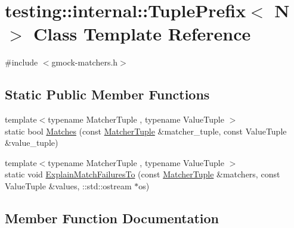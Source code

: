 \hypertarget{classtesting_1_1internal_1_1_tuple_prefix}{}\section{testing\+:\+:internal\+:\+:Tuple\+Prefix$<$ N $>$ Class Template Reference}
\label{classtesting_1_1internal_1_1_tuple_prefix}


{\ttfamily \#include $<$gmock-\/matchers.\+h$>$}

\subsection*{Static Public Member Functions}
\begin{DoxyCompactItemize}
\item 
{\footnotesize template$<$typename Matcher\+Tuple , typename Value\+Tuple $>$ }\\static bool \hyperlink{classtesting_1_1internal_1_1_tuple_prefix_ada24ceee73c02e3bb7f8264143170f7a}{Matches} (const \hyperlink{structtesting_1_1internal_1_1_matcher_tuple}{Matcher\+Tuple} \&matcher\+\_\+tuple, const Value\+Tuple \&value\+\_\+tuple)
\item 
{\footnotesize template$<$typename Matcher\+Tuple , typename Value\+Tuple $>$ }\\static void \hyperlink{classtesting_1_1internal_1_1_tuple_prefix_a0ffd38ce90ae6da645a5655aefac5bb7}{Explain\+Match\+Failures\+To} (const \hyperlink{structtesting_1_1internal_1_1_matcher_tuple}{Matcher\+Tuple} \&matchers, const Value\+Tuple \&values, \+::std\+::ostream $\ast$os)
\end{DoxyCompactItemize}


\subsection{Member Function Documentation}
\mbox{\label{classtesting_1_1internal_1_1_tuple_prefix_a0ffd38ce90ae6da645a5655aefac5bb7}} 
